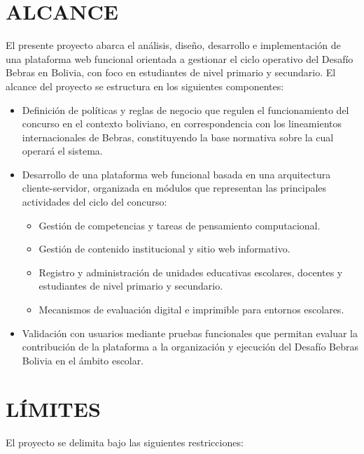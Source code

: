 \clearpage

\section{ALCANCE}

    El presente proyecto abarca el análisis, diseño, desarrollo e implementación de
    una plataforma web funcional orientada a gestionar el ciclo operativo del Desafío
    Bebras en Bolivia, con foco en estudiantes de nivel primario y secundario.
    El alcance del proyecto se estructura en los siguientes componentes:

    \begin{itemize}
        \item Definición de políticas y reglas de negocio que regulen el funcionamiento del concurso en el contexto boliviano, en correspondencia con los lineamientos internacionales de Bebras, constituyendo la base normativa sobre la cual operará el sistema.

        \item Desarrollo de una plataforma web funcional basada en una arquitectura cliente-servidor, organizada en módulos que representan las principales actividades del ciclo del concurso:
        \begin{itemize}
            \item Gestión de competencias y tareas de pensamiento computacional.
            \item Gestión de contenido institucional y sitio web informativo.
            \item Registro y administración de unidades educativas escolares, docentes y estudiantes de nivel primario y secundario.
            \item Mecanismos de evaluación digital e imprimible para entornos escolares.
        \end{itemize}

        \item Validación con usuarios mediante pruebas funcionales que permitan evaluar la contribución de la plataforma a la organización y ejecución del Desafío Bebras Bolivia en el ámbito escolar.
    \end{itemize}

\section{LÍMITES}

    El proyecto se delimita bajo las siguientes restricciones:

